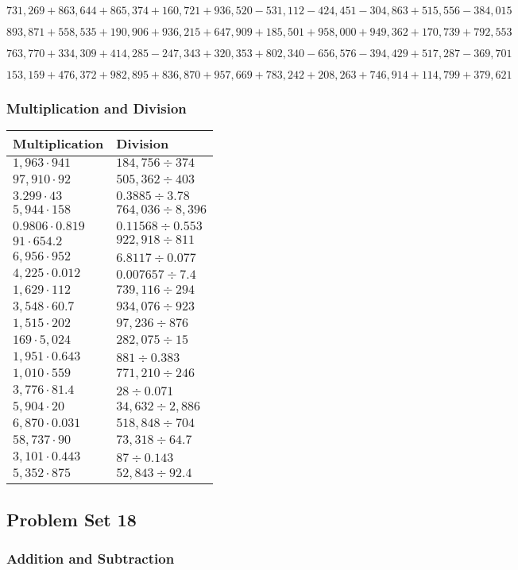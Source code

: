 \(731,269+863,644+865,374+160,721+936,520-531,112-424,451-304,863+515,556-384,015\)

\(893,871+558,535+190,906+936,215+647,909+185,501+958,000+949,362+170,739+792,553\)

\(763,770+334,309+414,285-247,343+320,353+802,340-656,576-394,429+517,287-369,701\)

\(153,159+476,372+982,895+836,870+957,669+783,242+208,263+746,914+114,799+379,621\)

\hypertarget{multiplication-and-division-321}{%
\subsubsection{Multiplication and
Division}\label{multiplication-and-division-321}}

\begin{longtable}[]{@{}ll@{}}
\toprule
Multiplication & Division\tabularnewline
\midrule
\endhead
\(1,963\cdot941\) & \(184,756÷374\)\tabularnewline
\(97,910\cdot92\) & \(505,362÷403\)\tabularnewline
\(3.299\cdot43\) & \(0.3885÷3.78\)\tabularnewline
\(5,944\cdot158\) & \(764,036÷8,396\)\tabularnewline
\(0.9806\cdot0.819\) & \(0.11568÷0.553\)\tabularnewline
\(91\cdot654.2\) & \(922,918÷811\)\tabularnewline
\(6,956\cdot952\) & \(6.8117÷0.077\)\tabularnewline
\(4,225\cdot0.012\) & \(0.007657÷7.4\)\tabularnewline
\(1,629\cdot112\) & \(739,116÷294\)\tabularnewline
\(3,548\cdot60.7\) & \(934,076÷923\)\tabularnewline
\(1,515\cdot202\) & \(97,236÷876\)\tabularnewline
\(169\cdot5,024\) & \(282,075÷15\)\tabularnewline
\(1,951\cdot0.643\) & \(881÷0.383\)\tabularnewline
\(1,010\cdot559\) & \(771,210÷246\)\tabularnewline
\(3,776\cdot81.4\) & \(28÷0.071\)\tabularnewline
\(5,904\cdot20\) & \(34,632÷2,886\)\tabularnewline
\(6,870\cdot0.031\) & \(518,848÷704\)\tabularnewline
\(58,737\cdot90\) & \(73,318÷64.7\)\tabularnewline
\(3,101\cdot0.443\) & \(87÷0.143\)\tabularnewline
\(5,352\cdot875\) & \(52,843÷92.4\)\tabularnewline
\bottomrule
\end{longtable}

\hypertarget{problem-set-18-5}{%
\subsection{Problem Set 18}\label{problem-set-18-5}}

\hypertarget{addition-and-subtraction-323}{%
\subsubsection{Addition and
Subtraction}\label{addition-and-subtraction-323}}

